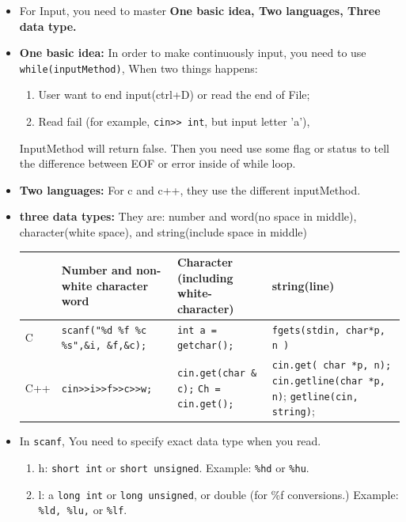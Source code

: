 \documentclass[a4paper,11pt,twoside]{book}
\newcommand{\tophline}{\hline }
\newcommand{\bottomhline}{\\ \hline }
\newcommand{\tophline}{ }
\newcommand{\bottomhline}{ }
\begin{document}
\begin{itemize}
	\item For Input, you need to master \textbf{One basic idea, Two languages, Three data type.}
	\item \textbf{One basic idea:} In order to make continuously input, you need to use \texttt{while(inputMethod)}, When two things happens:
	\begin{enumerate}
		\item User want to end input(ctrl+D) or read the end of File;
		\item Read fail (for example,  \verb|cin>> int|, but input letter 'a'),
	\end{enumerate}
	
	InputMethod will return false.  Then you need use some flag or status to tell the difference between EOF or error inside of while loop.
	
	\item \textbf{Two languages:} For c and c++, they use the different inputMethod. 
	
	\item \textbf{three data types:} They are: number and word(no space in middle), character(white space), and string(include space in middle)
	
	\begin{tabular}{|p{}|p{}|p{}|p{}|}
		\tophline
		& Number and non-white  character word & Character (including white-character) & string(line)\\
		\tophline
		C &\texttt{scanf("\%d \%f \%c \%s",\&i, \&f,\&c);}  & \texttt{int a = getchar();} & \texttt{fgets(stdin, char*p, n )} \\
		\tophline
		C++ & \verb|cin>>i>>f>>c>>w;| & \texttt{cin.get(char \& c);} \newline  \texttt{Ch = cin.get();} & \texttt{cin.get( char *p, n);} \newline \texttt{cin.getline(char *p, n)}; \newline \texttt{getline(cin, string)};
		\bottomhline
	\end{tabular}
	
	
	\item In \texttt{scanf}, You need to specify exact data type when you read.
	\begin{enumerate}
		\item h:  \texttt{short int} or \texttt{short unsigned}. Example: \texttt{\%hd} or \texttt{\%hu}.
		
		\item l:  a \texttt{long int} or \texttt{long unsigned}, or double (for \%f conversions.) Example: \texttt{\%ld, \%lu,} or \texttt{\%lf}.
		

\end{enumerate}
\end{itemize}
\end{document}
